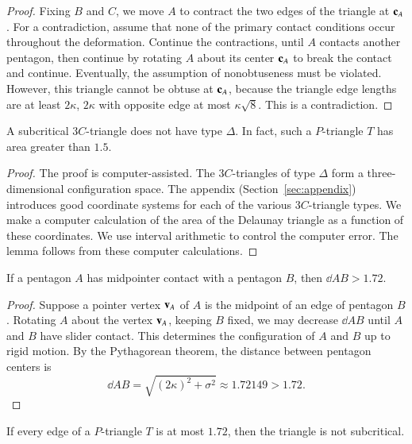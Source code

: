 \begin{proof} Fixing $B$ and $C$, we move $A$ to contract the two
  edges of the triangle at ${\mathbf c}_A$.  For a contradiction, assume that
  none of the primary contact conditions occur throughout the
  deformation.  Continue the contractions, until $A$ contacts another
  pentagon, then continue by rotating $A$ about its center ${\mathbf c}_A$ to
  break the contact and continue.  Eventually, the assumption of
  nonobtuseness must be violated.  However, this triangle cannot be
  obtuse at ${\mathbf c}_A$, because the triangle edge lengths are at least $2
  \kappa$, $2 \kappa$ with opposite edge at most
  $\kappa\sqrt{8}$. This is a contradiction.
\end{proof}

\begin{lemma}\label{lemma:delta} A subcritical $3C$-triangle does not have type $\Delta$.
  In fact, such a $P$-triangle $T$ has area greater than $1.5$.
\end{lemma}

\begin{proof} The proof is computer-assisted.  The $3C$-triangles of
  type $\Delta$ form a three-dimensional configuration space.  The
  appendix (Section~\ref{sec:appendix}) introduces good coordinate
  systems for each of the various $3C$-triangle types.  We make a
  computer calculation of the area of the Delaunay triangle as a
  function of these coordinates.  We use interval arithmetic to
  control the computer error.  The lemma follows from these computer
  calculations.
\end{proof}



\begin{lemma}\label{lemma:mid-172}  
  If a pentagon $A$ has midpointer contact with a pentagon $B$, then
  $\dd{A}{B} > 1.72$.
\end{lemma}

\begin{proof} Suppose a pointer vertex ${\mathbf v}_A$ of $A$ is the midpoint of an
  edge of pentagon $B$.  Rotating $A$ about the vertex ${\mathbf v}_A$, keeping
  $B$ fixed, we may decrease $\dd{A}{B}$ until $A$ and $B$
  have slider contact.  This determines the configuration of $A$ and
  $B$ up to rigid motion.  By the Pythagorean theorem, the
  distance between pentagon centers is
\[
\dd{A}{B} = \sqrt{(2\kappa)^2 + \sigma^2} \approx 1.72149 > 1.72.
\] %
\end{proof}

\begin{lemma}\label{lemma:172}
  If every edge of a $P$-triangle $T$ is at most $1.72$, then the
  triangle is not subcritical.
\end{lemma}

